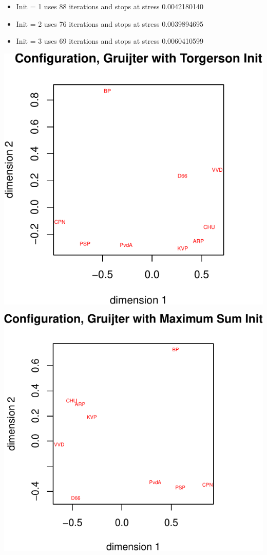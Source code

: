\documentclass[
  12pt,
]{article}
\providecommand{\tightlist}{%
  \setlength{\itemsep}{0pt}\setlength{\parskip}{0pt}}
\begin{document}
\begin{itemize}
\tightlist
\item
  Init = 1 uses 88 iterations and stops at stress 0.0042180140
\item
  Init = 2 uses 76 iterations and stops at stress 0.0039894695
\item
  Init = 3 uses 69 iterations and stops at stress 0.0060410599
\end{itemize}

\begin{center}\includegraphics{smacofRO_files/figure-latex/gruiterconfs-1} \end{center}

\begin{center}\includegraphics{smacofRO_files/figure-latex/gruiterconfs-2} \end{center}
\end{document}
